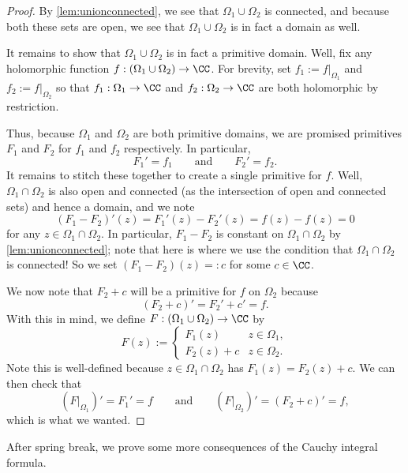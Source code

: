 \begin{proof}
	By \autoref{lem:unionconnected}, we see that $\Omega_1\cup\Omega_2$ is connected, and because both these sets are open, we see that $\Omega_1\cup\Omega_2$ is in fact a domain as well.
	
	It remains to show that $\Omega_1\cup\Omega_2$ is in fact a primitive domain. Well, fix any holomorphic function $f:(\Omega_1\cup\Omega_2)\to\CC$. For brevity, set $f_1:=f|_{\Omega_1}$ and $f_2:=f|_{\Omega_2}$ so that $f_1:\Omega_1\to\CC$ and $f_2:\Omega_2\to\CC$ are both holomorphic by restriction.

	Thus, because $\Omega_1$ and $\Omega_2$ are both primitive domains, we are promised primitives $F_1$ and $F_2$ for $f_1$ and $f_2$ respectively. In particular,
	\[F_1'=f_1\qquad\text{and}\qquad F_2'=f_2.\]
	It remains to stitch these together to create a single primitive for $f$. Well, $\Omega_1\cap\Omega_2$ is also open and connected (as the intersection of open and connected sets) and hence a domain, and we note
	\[(F_1-F_2)'(z)=F_1'(z)-F_2'(z)=f(z)-f(z)=0\]
	for any $z\in\Omega_1\cap\Omega_2$. In particular, $F_1-F_2$ is constant on $\Omega_1\cap\Omega_2$ by \autoref{lem:unionconnected}; note that here is where we use the condition that $\Omega_1\cap\Omega_2$ is connected! So we set $(F_1-F_2)(z)=:c$ for some $c\in\CC$.

	We now note that $F_2+c$ will be a primitive for $f$ on $\Omega_2$ because
	\[(F_2+c)'=F_2'+c'=f.\]
	With this in mind, we define $F:(\Omega_1\cup\Omega_2)\to\CC$ by
	\[F(z):=\begin{cases}
		F_1(z) & z\in\Omega_1, \\
		F_2(z)+c & z\in\Omega_2.
	\end{cases}\]
	Note this is well-defined because $z\in\Omega_1\cap\Omega_2$ has $F_1(z)=F_2(z)+c$. We can then check that
	\[(F|_{\Omega_1})'=F_1'=f\qquad\text{and}\qquad(F|_{\Omega_2})'=(F_2+c)'=f,\]
	which is what we wanted.
\end{proof}
After spring break, we prove some more consequences of the Cauchy integral formula.